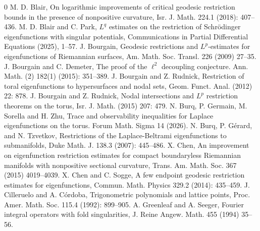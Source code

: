 \documentclass[11pt,reqno]{amsart}
\numberwithin{equation}{section}
\newcommand{\1}{\textbf{1}}
\begin{document}
	
	
	
	
	
	
	
	
	
	\begin{thebibliography}{0}
		M. D.  Blair, On logarithmic improvements of critical geodesic restriction bounds in the presence of nonpositive curvature, Isr. J. Math. 224.1 (2018): 407--436.
		M. D. Blair and C. Park, $L^q$ estimates on the restriction of Schr\"odinger eigenfunctions with singular potentials, Communications in Partial Differential Equations (2025), 1--57.
		J. Bourgain, Geodesic restrictions and $L^p$-estimates for eigenfunctions of Riemannian surfaces, Am. Math. Soc. Transl. 226 (2009) 27--35.
		J. Bourgain and C. Demeter, The proof of the $\ell^2$
		decoupling conjecture. Ann. Math. (2) 182(1) (2015): 351--389.
		J. Bourgain and Z. Rudnick, Restriction of toral eigenfunctions to hypersurfaces and nodal sets, Geom. Funct. Anal. (2012) 22: 878.
		 J. Bourgain and Z. Rudnick, Nodal intersections and $L^p$ restriction theorems on the torus, Isr. J. Math. (2015) 207: 479.
		N. Burq, P. Germain, M. Sorella and H. Zhu, Trace and observability inequalities for Laplace eigenfunctions on the torus.
		Forum Math. Sigma 14 (2026).
		 N. Burq, P. G\'erard, and N. Tzvetkov, Restrictions of the Laplace-Beltrami eigenfunctions to submanifolds, Duke Math. J. 138.3 (2007): 445--486.
		X. Chen, An improvement on eigenfunction restriction estimates for compact boundaryless Riemannian manifolds with nonpositive sectional curvature, Trans. Am. Math. Soc. 367 (2015) 4019--4039.
		 X. Chen and C. Sogge, A few endpoint geodesic restriction estimates for eigenfunctions, Commun. Math. Physics 329.2 (2014): 435--459.
		J. Cilleruelo and A. C\'ordoba, Trigonometric polynomials and lattice points, Proc. Amer. Math. Soc. 115.4 (1992): 899--905.
		A. Greenleaf and A. Seeger, Fourier integral operators with fold singularities, J. Reine Angew. Math. 455 (1994) 35--56.
		

\end{thebibliography}
\end{document}
